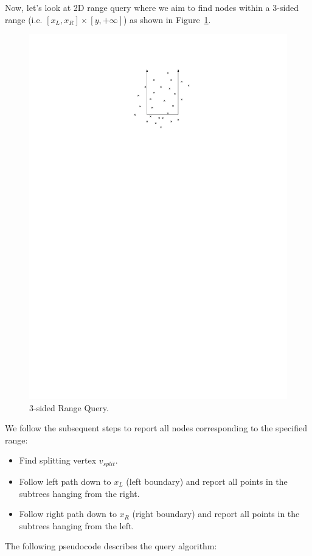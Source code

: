 Now, let's look at 2D range query where we aim to find nodes within a 3-sided range (i.e. $[x_L, x_R] \times [y, +\infty]$) as shown in Figure~\ref{fig:PST2}.
\begin{figure}[h!]
\begin{center}
  \includegraphics[scale = 1]{ipe/RQ2.pdf}
  \vspace{-0.1in}
  \caption{3-sided Range Query.}
  \label{fig:PST2}
\end{center}
\end{figure}


We follow the subsequent steps to report all nodes corresponding to the specified range:
\begin{itemize}
    \item Find splitting vertex $v_{split}$.
    \item Follow left path down to $x_L$ (left boundary) and report all points in the subtrees hanging from the right.
    \item Follow right path down to $x_R$ (right boundary) and report all points in the subtrees hanging from the left.
\end{itemize}
The following pseudocode describes the query algorithm:

